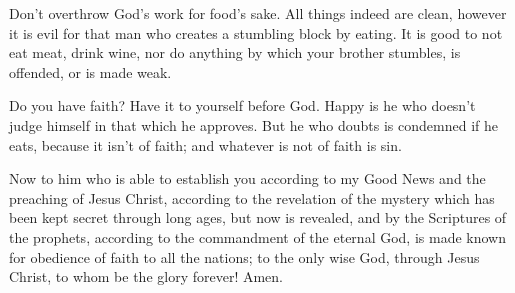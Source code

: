 {Don’t overthrow God’s work for food’s sake. All things indeed are clean, however it is evil for that man who creates a stumbling block by eating.
It is good to not eat meat, drink wine, nor do anything by which your brother stumbles, is offended, or is made weak.
\par }{\PP {}Do you have faith? Have it to yourself before God. Happy is he who doesn’t judge himself in that which he approves.
But he who doubts is condemned if he eats, because it isn’t of faith; and whatever is not of faith is sin.
\par }{\PP {}Now to him who is able to establish you according to my Good News and the preaching of Jesus Christ, according to the revelation of the mystery which has been kept secret through long ages,
but now is revealed, and by the Scriptures of the prophets, according to the commandment of the eternal God, is made known for obedience of faith to all the nations;
to the only wise God, through Jesus Christ, to whom be the glory forever! Amen.

}
